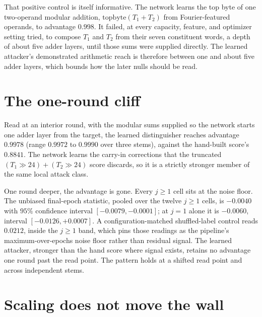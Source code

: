 \documentclass[11pt]{article}
\begin{document}
That positive control is itself informative. The network learns the top
byte of one two-operand modular addition, $\mathrm{topbyte}(T_1+T_2)$ from
Fourier-featured operands, to advantage $0.998$. It failed, at every
capacity, feature, and optimizer setting tried, to compose $T_1$ and $T_2$
from their seven constituent words, a depth of about five adder layers,
until those sums were supplied directly. The learned attacker's
demonstrated arithmetic reach is therefore between one and about five adder
layers, which bounds how the later nulls should be read.

\section{The one-round cliff}\label{sec:cliff}

Read at an interior round, with the modular sums supplied so the network
starts one adder layer from the target, the learned distinguisher reaches
advantage $0.9978$ (range $0.9972$ to $0.9990$ over three stems), against
the hand-built score's $0.8841$. The network learns the carry-in
corrections that the truncated $(T_1\!\gg\!24)+(T_2\!\gg\!24)$ score
discards, so it is a strictly stronger member of the same local attack
class.

One round deeper, the advantage is gone. Every $j\ge1$ cell sits at the
noise floor. The unbiased final-epoch statistic, pooled over the twelve
$j\ge1$ cells, is $-0.0040$ with $95\%$ confidence interval $[-0.0079,
-0.0001]$; at $j=1$ alone it is $-0.0060$, interval $[-0.0126, +0.0007]$.
A configuration-matched shuffled-label control reads $0.0212$, inside the
$j\ge1$ band, which pins those readings as the pipeline's
maximum-over-epochs noise floor rather than residual signal. The learned
attacker, stronger than the hand score where signal exists, retains no
advantage one round past the read point. The pattern holds at a shifted
read point and across independent stems.

\section{Scaling does not move the wall}\label{sec:scale}
\end{document}
